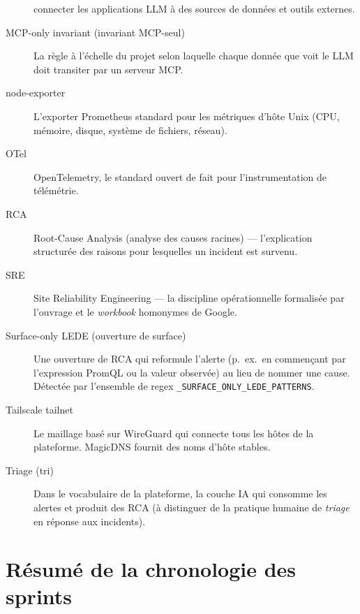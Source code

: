 \documentclass[11pt,a4paper,oneside]{report}
\begin{document}
\begin{description}
    connecter les applications LLM à des sources de données et
    outils externes.
\item[MCP-only invariant (invariant MCP-seul)] La règle à l'échelle
    du projet selon laquelle chaque donnée que voit le LLM doit
    transiter par un serveur MCP.
\item[node-exporter] L'exporter Prometheus standard pour les
    métriques d'hôte Unix (CPU, mémoire, disque, système de
    fichiers, réseau).
\item[OTel] OpenTelemetry, le standard ouvert de fait pour
    l'instrumentation de télémétrie.
\item[RCA] Root-Cause Analysis (analyse des causes racines) ---
    l'explication structurée des raisons pour lesquelles un
    incident est survenu.
\item[SRE] Site Reliability Engineering --- la discipline
    opérationnelle formalisée par l'ouvrage et le \emph{workbook}
    homonymes de Google.
\item[Surface-only LEDE (ouverture de surface)] Une ouverture de
    RCA qui reformule l'alerte (p.~ex.\ en commençant par
    l'expression PromQL ou la valeur observée) au lieu de nommer
    une cause. Détectée par l'ensemble de regex
    \texttt{\_SURFACE\_ONLY\_LEDE\_PATTERNS}.
\item[Tailscale tailnet] Le maillage basé sur WireGuard qui
    connecte tous les hôtes de la plateforme. MagicDNS fournit des
    noms d'hôte stables.
\item[Triage (tri)] Dans le vocabulaire de la plateforme, la couche
    IA qui consomme les alertes et produit des RCA (à distinguer
    de la pratique humaine de \emph{triage} en réponse aux
    incidents).
\end{description}

\chapter{Résumé de la chronologie des sprints}
\label{app:sprint-summary}
\end{document}
